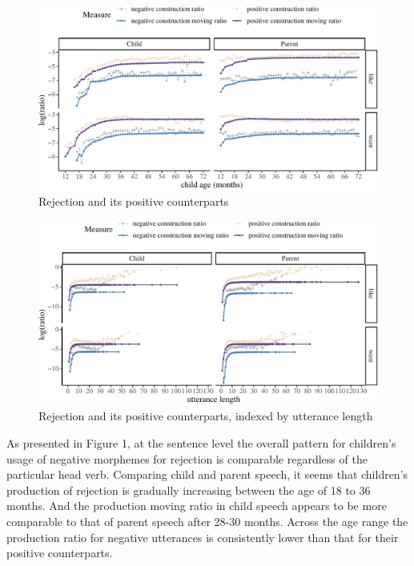 \documentclass[
  english,
  man,floatsintext]{apa6}
\begin{document}
\begin{figure}[H]

{\centering \includegraphics{neg_construction_article_files/figure-latex/emotion-1} 

}

\caption{Rejection and its positive counterparts}\label{fig:emotion}
\end{figure}

\begin{figure}[H]

{\centering \includegraphics{neg_construction_article_files/figure-latex/emotionul-1} 

}

\caption{Rejection and its positive counterparts, indexed by utterance length}\label{fig:emotionul}
\end{figure}

As presented in Figure 1, at the sentence level the overall pattern for children's usage of negative morphemes for rejection is comparable regardless of the particular head verb. Comparing child and parent speech, it seems that children's production of rejection is gradually increasing between the age of 18 to 36 months. And the production moving ratio in child speech appears to be more comparable to that of parent speech after 28-30 months. Across the age range the production ratio for negative utterances is consistently lower than that for their positive counterparts.
\end{document}
